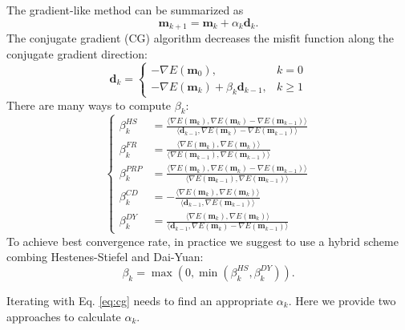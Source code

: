 The gradient-like method can be summarized as
\begin{equation}\label{eq:cg}
\textbf{m}_{k+1}=\textbf{m}_k+\alpha_k \textbf{d}_k.
\end{equation}
The conjugate gradient (CG) algorithm decreases the misfit function along the conjugate gradient direction:
\begin{equation}
	\textbf{d}_k=
	\begin{cases}
	-\nabla E(\textbf{m}_0), & k=0\\
	-\nabla E(\textbf{m}_k)+\beta_k \textbf{d}_{k-1}, & k\geq 1
	\end{cases}
\end{equation}
There are many ways to compute $\beta_k$:
\begin{equation}\label{eq:beta}
\left\{
\begin{split}
\beta_k^{HS}&=\frac{\langle\nabla E(\textbf{m}_k),\nabla E(\textbf{m}_k)-\nabla E(\textbf{m}_{k-1})\rangle}{\langle\textbf{d}_{k-1},\nabla E(\textbf{m}_k)-\nabla E(\textbf{m}_{k-1})\rangle}\\
\beta_k^{FR}&=\frac{\langle\nabla E(\textbf{m}_k),\nabla E(\textbf{m}_k)\rangle}{\langle\nabla E(\textbf{m}_{k-1}),\nabla E(\textbf{m}_{k-1})\rangle}\\
\beta_k^{PRP}&=\frac{\langle\nabla E(\textbf{m}_k),\nabla E(\textbf{m}_k)-\nabla E(\textbf{m}_{k-1})\rangle}{\langle\nabla E(\textbf{m}_{k-1}),\nabla E(\textbf{m}_{k-1})\rangle}\\
\beta_k^{CD}&=-\frac{\langle\nabla E(\textbf{m}_k),\nabla E(\textbf{m}_k)\rangle}{\langle\textbf{d}_{k-1},\nabla E(\textbf{m}_{k-1})\rangle}\\
\beta_k^{DY}&=\frac{\langle\nabla E(\textbf{m}_k),\nabla E(\textbf{m}_k)\rangle}{\langle\textbf{d}_{k-1},\nabla E(\textbf{m}_k)-\nabla E(\textbf{m}_{k-1})\rangle}
\end{split}
\right.
\end{equation}
To achieve best convergence rate, in practice we suggest to use a hybrid scheme combing Hestenes-Stiefel and Dai-Yuan:
\begin{equation}
\beta_k=\max(0, \min(\beta_k^{HS},\beta_k^{DY})).
\end{equation}

Iterating with Eq. \eqref{eq:cg} needs to find an appropriate $\alpha_k$. Here we provide two approaches to calculate $\alpha_k$.


